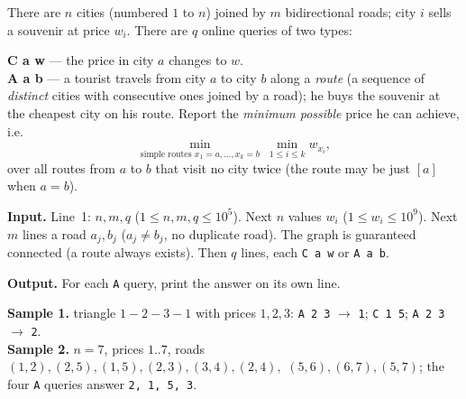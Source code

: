 \begin{problemstatement}[CF 487E Tourists]
There are \(n\) cities (numbered \(1\) to \(n\)) joined by \(m\) bidirectional roads; city \(i\)
sells a souvenir at price \(w_i\). There are \(q\) online queries of two types:

\textbf{C a w} --- the price in city \(a\) changes to \(w\).\\
\textbf{A a b} --- a tourist travels from city \(a\) to city \(b\) along a \emph{route} (a sequence of
\emph{distinct} cities with consecutive ones joined by a road); he buys the souvenir at the cheapest
city on his route. Report the \emph{minimum possible} price he can achieve, i.e.\
\[
  \min_{\text{simple routes } x_1=a,\dots,x_k=b}\ \min_{1\le i\le k} w_{x_i},
\]
over all routes from \(a\) to \(b\) that visit no city twice (the route may be just \([a]\) when
\(a=b\)).

\textbf{Input.} Line~1: \(n,m,q\) (\(1\le n,m,q\le 10^5\)). Next \(n\) values \(w_i\)
(\(1\le w_i\le 10^9\)). Next \(m\) lines a road \(a_j,b_j\) (\(a_j\ne b_j\), no duplicate road). The
graph is guaranteed connected (a route always exists). Then \(q\) lines, each \texttt{C a w} or
\texttt{A a b}.

\textbf{Output.} For each \texttt{A} query, print the answer on its own line.

\textbf{Sample 1.} triangle \(1\!-\!2\!-\!3\!-\!1\) with prices \(1,2,3\):
\texttt{A 2 3} \(\to\) \texttt{1}; \texttt{C 1 5}; \texttt{A 2 3} \(\to\) \texttt{2}.\\
\textbf{Sample 2.} \(n{=}7\), prices \(1..7\), roads \((1,2),(2,5),(1,5),(2,3),(3,4),(2,4),\)
\((5,6),(6,7),(5,7)\); the four \texttt{A} queries answer \texttt{2, 1, 5, 3}.
\end{problemstatement}

